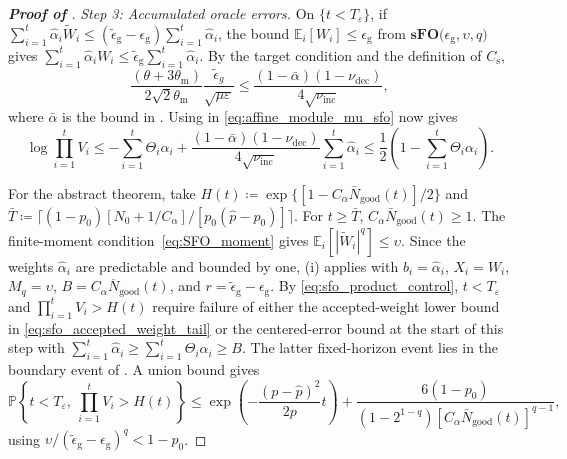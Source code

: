 \documentclass{article}
\begin{document}
\begin{proof}[\textbf{Proof of }]
\par\smallskip
\noindent\emph{Step 3: Accumulated oracle errors.}
On \(\{t<T_\varepsilon\}\), if
\(\sum_{i=1}^t\hat\alpha_i\widetilde W_i
\le(\widetilde\epsilon_{\mathrm{g}}-\epsilon_{\mathrm{g}})\sum_{i=1}^t\hat\alpha_i\), the bound \(\mathbb E_i[W_i]\le\epsilon_{\mathrm g}\) from \(\textbf{sFO(}\epsilon_{\mathrm g},\upsilon,q\textbf{)}\) gives
\(\sum_{i=1}^t\hat\alpha_iW_i
\le\widetilde\epsilon_{\mathrm{g}}\sum_{i=1}^t\hat\alpha_i\).
By the target condition and the definition of \(C_{\mathrm{s}}\),
\[
\frac{(\theta+3\theta_{\mathrm{m}})}
{2\sqrt2\theta_{\mathrm{m}}}\frac{\widetilde\epsilon_g}{\sqrt{\mu\varepsilon}}
\le\frac{(1-\bar\alpha)(1-\nu_{\mathrm{dec}})}{4\sqrt{\nu_{\mathrm{inc}}}},
\]
where \(\bar\alpha\) is the bound in .
Using  in \eqref{eq:affine_module_mu_sfo} now gives
\begin{equation}\label{eq:sfo_product_control}
\log\prod_{i=1}^t V_i
\le-\sum_{i=1}^t\Theta_i\alpha_i
+\frac{(1-\bar\alpha)(1-\nu_{\mathrm{dec}})}{4\sqrt{\nu_{\mathrm{inc}}}}
\sum_{i=1}^t\hat\alpha_i
\le\frac12\left(1-\sum_{i=1}^t\Theta_i\alpha_i\right).
\end{equation}

For the abstract theorem, take
\(H(t)\coloneqq \exp\{[1-C_\alpha\bar N_{\mathrm{good}}(t)]/2\}\) and
\(\bar T\coloneqq \lceil(1-p_0)[N_0+1/C_\alpha]/
[p_0(\hat p-p_0)]\rceil\).
For \(t\ge\bar T\), \(C_\alpha\bar N_{\mathrm{good}}(t)\ge1\). The finite-moment condition~\eqref{eq:SFO_moment} gives \(\mathbb E_i[|\widetilde W_i|^q]\le\upsilon\). Since the weights \(\hat\alpha_i\) are predictable and bounded by one, (i) applies with \(b_i=\hat\alpha_i\), \(X_i=W_i\), \(M_q=\upsilon\), \(B=C_\alpha\overline N_{\mathrm{good}}(t)\), and \(r=\widetilde\epsilon_{\mathrm g}-\epsilon_{\mathrm g}\).
By \eqref{eq:sfo_product_control},
\(t<T_\varepsilon\) and \(\prod_{i=1}^tV_i>H(t)\) require failure of either
the accepted-weight lower bound in \eqref{eq:sfo_accepted_weight_tail}
or the centered-error bound at the start of this step with
\(\sum_{i=1}^t\hat\alpha_i\ge
\sum_{i=1}^t\Theta_i\alpha_i\ge B\).
The latter fixed-horizon event lies in the boundary event of
. A union bound gives
\begin{equation}\label{eq:abstract_tail_mu_sfo}
\mathbb P\left\{t<T_\varepsilon,\ \prod_{i=1}^t V_i>H(t)\right\}
\le\exp\!\left(-\frac{(p-\hat p)^2}{2p}t\right)
+\frac{6(1-p_0)}
{(1-2^{1-q})[C_\alpha\bar N_{\mathrm{good}}(t)]^{q-1}},
\end{equation}
using \(\upsilon/(\widetilde\epsilon_{\mathrm{g}}-\epsilon_{\mathrm{g}})^q<1-p_0\).


\end{proof}
\end{document}
